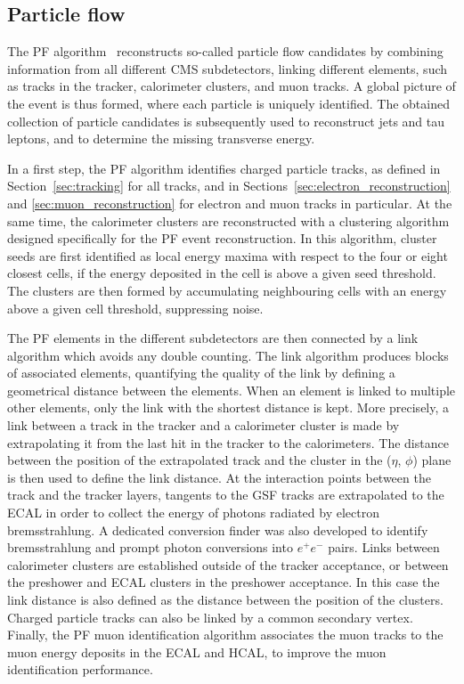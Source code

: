 \subsection{Particle flow}
\label{sec:PF}

The \acf{PF} algorithm~\cite{CMS-PRF-14-001} reconstructs so-called particle flow candidates by combining information from all different \ac{CMS} subdetectors, linking different elements, such as tracks in the tracker, calorimeter clusters, and muon tracks. A global picture of the event is thus formed, where each particle is uniquely identified. The obtained collection of particle candidates is subsequently used to reconstruct jets and tau leptons, and to determine the missing transverse energy.

In a first step, the \ac{PF} algorithm identifies charged particle tracks, as defined in Section~\ref{sec:tracking} for all tracks, and in Sections~\ref{sec:electron_reconstruction} and \ref{sec:muon_reconstruction} for electron and muon tracks in particular. At the same time, the calorimeter clusters are reconstructed with a clustering algorithm designed specifically for the \ac{PF} event reconstruction. In this algorithm, cluster seeds are first identified as local energy maxima with respect to the four or eight closest cells, if the energy deposited in the cell is above a given seed threshold. The clusters are then formed by accumulating neighbouring cells with an energy above a given cell threshold, suppressing noise.

The \ac{PF} elements in the different subdetectors are then connected by a link algorithm which avoids any double counting. The link algorithm produces blocks of associated elements, quantifying the quality of the link by defining a geometrical distance between the elements. When an element is linked to multiple other elements, only the link with the shortest distance is kept. More precisely, a link between a track in the tracker and a calorimeter cluster is made by extrapolating it from the last hit in the tracker to the calorimeters. The distance between the position of the extrapolated track and the cluster in the ($\eta$, $\phi$) plane is then used to define the link distance. At the interaction points between the track and the tracker layers, tangents to the \ac{GSF} tracks are extrapolated to the \ac{ECAL} in order to collect the energy of photons radiated by electron bremsstrahlung. A dedicated conversion finder was also developed to identify bremsstrahlung and prompt photon conversions into $e^+e^-$ pairs. Links between calorimeter clusters are established outside of the tracker acceptance, or between the preshower and \ac{ECAL} clusters in the preshower acceptance. In this case the link distance is also defined as the distance between the position of the clusters. Charged particle tracks can also be linked by a common secondary vertex. Finally, the \ac{PF} muon identification algorithm associates the muon tracks to the muon energy deposits in the \ac{ECAL} and \ac{HCAL}, to improve the muon identification performance.

